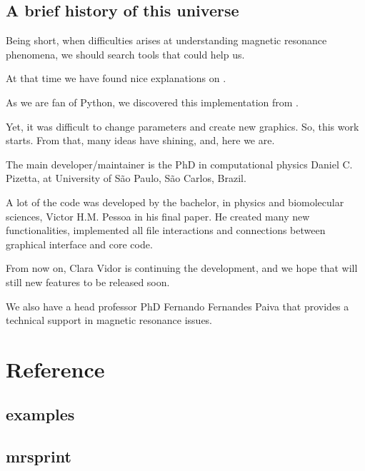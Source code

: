 \documentclass[a4paper,10pt,english]{sphinxmanual}
\begin{document}
\section{A brief history of this universe}
\label{\detokenize{history:a-brief-history-of-this-universe}}
Being short, when difficulties arises at understanding magnetic
resonance phenomena, we should search tools that could help us.

At that time we have found nice explanations on
.

As we are fan of Python, we discovered this implementation from
.

Yet, it was difficult to change parameters and create new graphics.
So, this work starts. From that, many ideas have shining, and, here we are.

The main developer/maintainer is the PhD in computational physics
Daniel C. Pizetta, at University of São Paulo, São Carlos, Brazil.

A lot of the code was developed by the bachelor, in physics and
biomolecular sciences, Victor H.M. Pessoa in his final paper.
He created many new functionalities, implemented
all file interactions and connections between graphical interface and
core code.

From now on, Clara Vidor is continuing the development, and we hope that
will still new features to be released soon.

We also have a head professor PhD Fernando Fernandes Paiva that provides
a technical support in magnetic resonance issues.


\chapter{Reference}
\label{\detokenize{modules:reference}}\label{\detokenize{modules::doc}}

\section{examples}
\label{\detokenize{autodoc/examples/modules:examples}}\label{\detokenize{autodoc/examples/modules::doc}}

\section{mrsprint}
\label{\detokenize{autodoc/mrsprint/modules:mrsprint}}\label{\detokenize{autodoc/mrsprint/modules::doc}}
\end{document}
